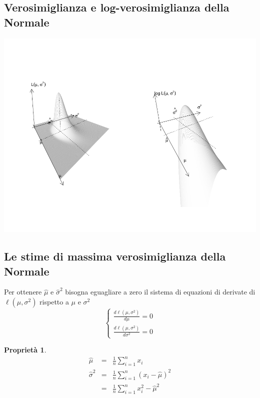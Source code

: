 \documentclass[
  11pt,
]{book}
\theoremstyle{mytheoremstyle}
\newtheorem{proposition}{Proprietà}[section]
\theoremstyle{mydefstyle}
\begin{document}
\subsection{Verosimiglianza e log-verosimiglianza della Normale}\label{verosimiglianza-e-log-verosimiglianza-della-normale}

\begin{center}\includegraphics{Appunti_di_Statistica_2025_files/figure-latex/12-Verosimiglianza-24-1} \end{center}

\subsection{Le stime di massima verosimiglianza della Normale}\label{le-stime-di-massima-verosimiglianza-della-normale}

Per ottenere \(\hat\mu\) e \(\hat\sigma^2\) bisogna eguagliare a zero il sistema di
equazioni di derivate di \(\ell(\mu,\sigma^2)\) rispetto a \(\mu\) e \(\sigma^2\)
\[
\begin{cases}
  \frac{d\ell(\mu,\sigma^2)}{d\mu}=0\\
  \frac{d\ell(\mu,\sigma^2)}{d\sigma^2}=0
\end{cases}
\]

\begin{info}

\begin{proposition}
\begin{eqnarray*}
  \hat\mu            &=& \frac 1 n \sum_{i=1}^n x_i\\
  \hat\sigma^2       &=& \frac 1 n \sum_{i=1}^n(x_i-\hat\mu)^2\\
                     &=& \frac 1 n \sum_{i=1}^n x_i^2 -\hat\mu^2
\end{eqnarray*}
\end{proposition}

\end{info}
\end{document}
